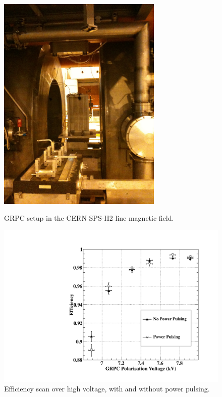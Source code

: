 \begin{figure}
 \begin{minipage}[t]{0.4\textwidth}
 \begin{center}
 \includegraphics*[width=0.7\textwidth,keepaspectratio]{Calorimeter/SDHCAL_GRPC/figures/BeamLine.jpg}
	\caption{GRPC setup in the CERN SPS-H2 line magnetic field.}
 \end{center}
 \end{minipage}
 \label{fig:Calorimeter:SDHCAL_GRPC:PP1}
 \hspace{0.02\textwidth}
 \begin{minipage}[t]{0.4\textwidth}
 \begin{center}
 \includegraphics*[width=\textwidth,keepaspectratio]{Calorimeter/SDHCAL_GRPC/figures/BField_Efficiency_PowerPulsed.pdf}
 \caption{Efficiency scan over high voltage, with and without power pulsing. }
 \end{center}
 \end{minipage}
 \label{fig:Calorimeter:SDHCAL_GRPC:PP2}
 \end{figure}



